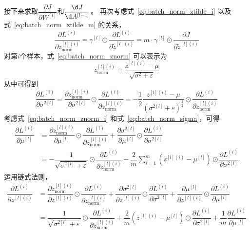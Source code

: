 接下来求取$\dfrac{\partial J}{\partial W^{[l]}}$和$\dfrac{\d J}{\d A^{[l-1]}}$。
再次考虑式~\eqref{eq:batch_norm_ztilde_i} 以及式~\eqref{eq:batch_norm_ztilde_m} 的关系，
\begin{equation}
    \dfrac{\partial L^{(i)}}{\partial z^{[l](i)}_{\mathrm{norm}}} 
    = \gamma^{[l]} \odot \dfrac{\partial L^{(i)}}{\partial \tilde{z}^{[l](i)}}
    = m \cdot \gamma^{[l]} \odot \dfrac{\partial J}{\partial \tilde{z}^{[l](i)}}
\end{equation}
对第$i$个样本，式~\eqref{eq:batch_norm_znorm} 可以表示为
\begin{equation}
    z^{[l](i)}_{\mathrm{norm}} = \dfrac{z^{[l](i)} - \mu}{\sqrt{\sigma^2 + \varepsilon}}
    \label{eq:batch_norm_znorm_i}
\end{equation}
从中可得到
\begin{equation}
    \dfrac{\partial L^{(i)}}{\partial \sigma^{2[l]}} 
    = \dfrac{\partial z^{[l](i)}_{\mathrm{norm}}}{\partial \sigma^{2[l]}} \odot \dfrac{\partial L^{(i)}}{\partial z^{[l](i)}_{\mathrm{norm}}} 
    = -\dfrac{1}{2} \dfrac{z^{[l](i)} - \mu}{(\sigma^{2[l]} + \varepsilon)^{\frac{\scriptstyle 3}{\scriptstyle 2}}} \odot \dfrac{\partial L^{(i)}}{\partial z^{[l](i)}_{\mathrm{norm}}}
\end{equation}
考虑式~\eqref{eq:batch_norm_znorm_i} 和式~\eqref{eq:batch_norm_sigma}，可得
\begin{equation}
    \begin{aligned}
        \dfrac{\partial L^{(i)}}{\partial \mu^{[l]}} 
        &= \dfrac{\partial z^{[l](i)}_{\mathrm{norm}}}{\partial \mu^{[l]}} \odot \dfrac{\partial L^{(i)}}{\partial z^{[l](i)}_{\mathrm{norm}}} + \dfrac{\partial \sigma^{2[l]}}{\partial \mu^{[l]}} \odot \dfrac{\partial L^{(i)}}{\partial \sigma^{2[l]}} \\
        &= -\dfrac{1}{\sqrt{\sigma^{2[l]} + \varepsilon}} \odot \dfrac{\partial L^{(i)}}{\partial z^{[l](i)}_{\mathrm{norm}}} - \dfrac{2}{m} \sum_{i=1}^m (z^{[l](i)} - \mu^{[l]}) \odot \dfrac{\partial L^{(i)}}{\partial \sigma^{2[l]}}
    \end{aligned}
\end{equation}
运用链式法则，
\begin{equation}
    \begin{aligned}
        \dfrac{\partial L^{(i)}}{\partial z^{[l](i)}} 
        &= \dfrac{\partial z^{[l](i)}_{\mathrm{norm}}}{\partial z^{[l](i)}} \odot \dfrac{\partial L^{(i)}}{\partial z^{[l](i)}_{\mathrm{norm}}} + \dfrac{\partial \sigma^{2[l]}}{\partial z^{[l](i)}} \odot \dfrac{\partial L^{(i)}}{\partial \sigma^{2[l]}} + \dfrac{\partial \mu^{[l]}}{\partial z^{[l](i)}} \odot \dfrac{\partial L^{(i)}}{\partial \mu^{[l]}} \\
        &= \dfrac{1}{\sqrt{\sigma^{2[l]} + \varepsilon}} \odot \dfrac{\partial L^{(i)}}{\partial z^{[l](i)}_{\mathrm{norm}}} + \dfrac{2}{m} (z^{[l](i)} - \mu^{[l]}) \odot \dfrac{\partial L^{(i)}}{\partial \sigma^{2[l]}} + \dfrac{1}{m} \dfrac{\partial L^{(i)}}{\partial \mu^{[l]}}
    \end{aligned}
\end{equation}
